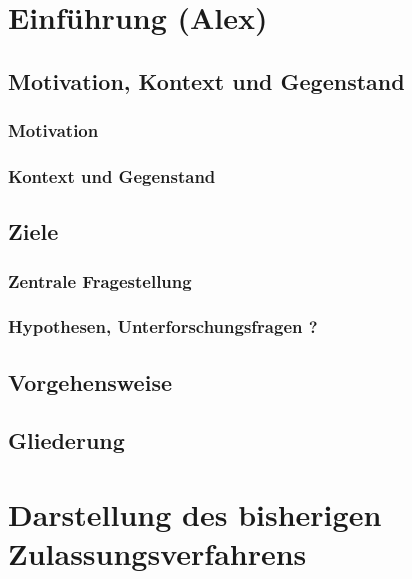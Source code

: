 \documentclass[a4paper, 11pt]{article}
\begin{document}
    \pagestyle{empty}
    
    \newpage
    \hypertarget{contents}{}
    \tableofcontents

    \newpage
    \pagestyle{fancy}
    \section{Einführung \small{(Alex)}}\label{sec:introduction}
        
		\subsection{Motivation, Kontext und Gegenstand}\label{sec:motivationcontext}
			
			\subsubsection{Motivation}\label{sec:motivation}
				
			\subsubsection{Kontext und Gegenstand}\label{sec:context}
				
		\subsection{Ziele}\label{sec:goals}
			
			\subsubsection{Zentrale Fragestellung}\label{sec:questions}
				
			\subsubsection{Hypothesen, Unterforschungsfragen \small{?}}\label{sec:hypotheses}
				

		\subsection{Vorgehensweise}\label{sec:procedure}
			
			\subsection{Gliederung}\label{sec:structure}
				

	\newpage
	\section{Darstellung des bisherigen Zulassungsverfahrens}\label{sec:admission}
		
\end{document}
